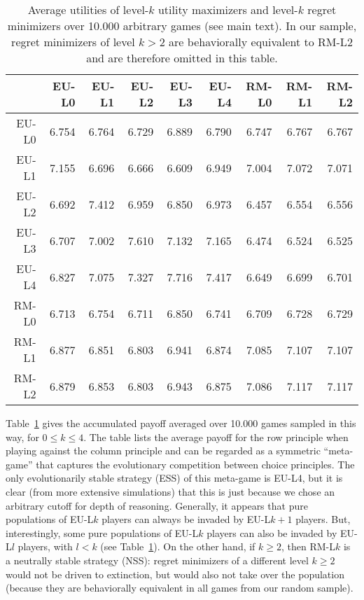 \documentclass{llncs}
\begin{document}
\begin{table}
  \centering
\begin{tabular}{rrrrrrrrr}
  \hline
 & EU-L0 & EU-L1 & EU-L2 & EU-L3 & EU-L4 & RM-L0 & RM-L1 & RM-L2 \\ 
  \hline
  EU-L0 & 6.754 & 6.764 & 6.729 & 6.889 & 6.790 & 6.747 & 6.767 & 6.767  \\ 
  EU-L1 & 7.155 & 6.696 & 6.666 & 6.609 & 6.949 & 7.004 & 7.072 & 7.071  \\ 
  EU-L2 & 6.692 & 7.412 & 6.959 & 6.850 & 6.973 & 6.457 & 6.554 & 6.556  \\ 
  EU-L3 & 6.707 & 7.002 & 7.610 & 7.132 & 7.165 & 6.474 & 6.524 & 6.525  \\ 
  EU-L4 & 6.827 & 7.075 & 7.327 & 7.716 & 7.417 & 6.649 & 6.699 & 6.701  \\ 
  RM-L0 & 6.713 & 6.754 & 6.711 & 6.850 & 6.741 & 6.709 & 6.728 & 6.729  \\ 
  RM-L1 & 6.877 & 6.851 & 6.803 & 6.941 & 6.874 & 7.085 & 7.107 & 7.107  \\ 
  RM-L2 & 6.879 & 6.853 & 6.803 & 6.943 & 6.875 & 7.086 & 7.117 & 7.117  \\ 
   \hline
\end{tabular}
\caption{Average utilities of level-$k$ utility maximizers and
  level-$k$ regret minimizers over 10.000 arbitrary games (see main
  text). In our sample, regret minimizers of level $k>2$ are
  behaviorally equivalent to RM-L$2$ and are therefore omitted in this table. } 
  \label{tab:MaxUtil}
\end{table}
 
Table~\ref{tab:MaxUtil} gives the accumulated payoff averaged over
10.000 games sampled in this way, for $0 \le k \le 4$. The table lists
the average payoff for the row principle when playing against the
column principle and can be regarded as a symmetric ``meta-game'' that
captures the evolutionary competition between choice principles. The
only evolutionarily stable strategy (ESS) of this meta-game is EU-L4,
but it is clear (from more extensive simulations) that this is just
because we chose an arbitrary cutoff for depth of
reasoning. Generally, it appears that pure populations of EU-L$k$
players can always be invaded by EU-L$k+1$ players. But,
interestingly, some pure populations of EU-L$k$ players can also be
invaded by EU-L$l$ players, with $l<k$ (see
Table~\ref{tab:MaxUtil}). On the other hand, if $k\ge2$, then RM-L$k$
is a neutrally stable strategy (NSS): regret minimizers of a different
level $k\ge2$ would not be driven to extinction, but would also not
take over the population (because they are behaviorally equivalent in
all games from our random sample).
\end{document}
